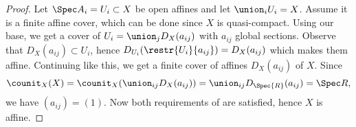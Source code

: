 
\begin{proof}
Let $\Spec A_i = U_i \subset X$ be open affines
and let $\union_i U_i = X$.
Assume it is a finite affine cover, which can be done since $X$ is quasi-compact.
Using our base, 
we get a cover of $U_i = \union_j D_X(a_{ij})$ 
with $a_{ij}$ global sections.
Observe that $D_X(a_{ij})\subset U_i$, 
hence $D_{U_i}(\restr{U_i}{a_{ij}}) = D_X(a_{ij})$
which makes them affine.
Continuing like this, 
we get a finite cover of affines $D_X(a_{ij})$ of $X$.
Since 
\[ \counit_X(X) = \counit_X(\union_{ij} D_X(a_{ij})) = \union_{ij} D_{\Spec{R}}(a_{ij}) = \Spec R,\]
we have $(a_{ij})=(1)$.
Now both requirements of \cite[Ex.2.17]{harts} are satisfied,
hence $X$ is affine.
\end{proof}